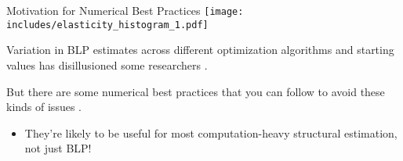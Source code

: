 \documentclass[aspectratio=169,t,11pt,table]{beamer}
\begin{document}
\begin{frame}{Motivation for Numerical Best Practices}
    \texttt{[image: includes/elasticity\_histogram\_1.pdf]}
    \begin{wideitemize}
        \item Variation in BLP estimates across different optimization algorithms and starting values has disillusioned some researchers \citep[e.g.,][]{knittel2014estimation}.
        \pause
        \item But there are some numerical best practices that you can follow to avoid these kinds of issues \citep{conlon2020best}.
        \begin{itemize}
            \item They're likely to be useful for most computation-heavy structural estimation, not just BLP!
        \end{itemize}
    \end{wideitemize}
\end{frame}
\end{document}
